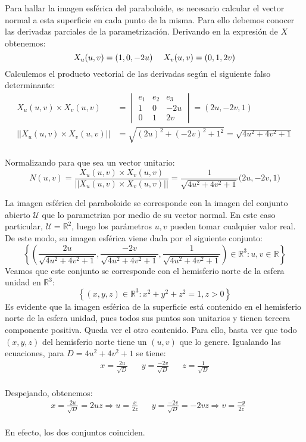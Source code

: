 \documentclass{article}
\begin{document}
\vspace{2mm}
Para hallar la imagen esférica del paraboloide, es necesario calcular el vector normal a esta
superficie en cada punto de la misma. Para ello debemos conocer las derivadas parciales de la
parametrización. Derivando en la expresión de $X$ obtenemos:
\vspace{2mm}
$$X_u(u,v) = (1,0,-2u) \hspace{3ex} X_v(u,v) = (0,1,2v)$$
\newpage
\noindent Calculemos el producto vectorial de las derivadas según el siguiente falso determinante:
\vspace{1mm}
\begin{align*}
    X_u(u,v) \times X_v(u,v) &= 
    \begin{vmatrix}
    e_1 & e_2 & e_3 \\
    1 & 0 & -2u \\
    0 & 1 & 2v
    \end{vmatrix}
    = (2u, -2v, 1) \\[3ex]
    ||X_u(u,v) \times X_v(u,v)|| &= \sqrt{(2u)^2 + (-2v)^2 + 1^2} = \sqrt{4u^2+4v^2+1}
\end{align*} \\
\noindent Normalizando para que sea un vector unitario:
$$N(u,v) = \frac{X_u(u,v) \times X_v(u,v)}{||X_u(u,v) \times X_v(u,v)||} 
= \frac{1}{\sqrt{4u^2+4v^2+1}}\Big(2u,-2v,1\Big)$$

\vspace{3mm}
La imagen esférica del paraboloide se corresponde con la imagen del conjunto abierto $\mathcal{U}$ que
lo parametriza por medio de su vector normal. En este caso particular, $\mathcal{U} = \mathbb{R}^2$, luego
los parámetros $u,v$ pueden tomar cualquier valor real. De este modo, su imagen esférica viene dada por el siguiente conjunto:
\vspace{1mm}
$$ \left\{\left(\frac{2u}{\sqrt{4u^2+4v^2+1}}, \frac{-2v}{\sqrt{4u^2+4v^2+1}},
\frac{1}{\sqrt{4u^2+4v^2+1}}\right) \in \mathbb{R}^3 : u,v \in \mathbb{R}\right\}$$
\noindent
Veamos que este conjunto se corresponde con el hemisferio norte de la esfera unidad en $\mathbb{R}^3$:
$$ \left\{(x,y,z) \in \mathbb{R}^3 : x^2+y^2+z^2 = 1,  z > 0\right\}$$
Es evidente que la imagen esférica de la superficie está contenido en el hemisferio norte de la esfera
unidad, pues todos sus puntos son unitarios y tienen tercera componente positiva. Queda ver el otro contenido.
Para ello, basta ver que todo $(x,y,z)$ del hemisferio norte tiene un $(u,v)$ que lo genere.
Igualando las ecuaciones, para $D = 4u^2 + 4v^2 + 1$ se tiene:
\begin{align*}
x = \frac{2u}{\sqrt{D}} &&
y = \frac{-2v}{\sqrt{D}} &&
z = \frac{1}{\sqrt{D}}
\end{align*}
\\[2ex]
Despejando, obtenemos:
\begin{align*}
    x = \frac{2u}{\sqrt{D}} = 2uz \Rightarrow u =  \frac{x}{2z} &&
    y = \frac{-2v}{\sqrt{D}} = -2vz \Rightarrow v =  \frac{-y}{2z} &&
\end{align*}
\\[2ex]
\noindent En efecto, los dos conjuntos coinciden.
\end{document}
